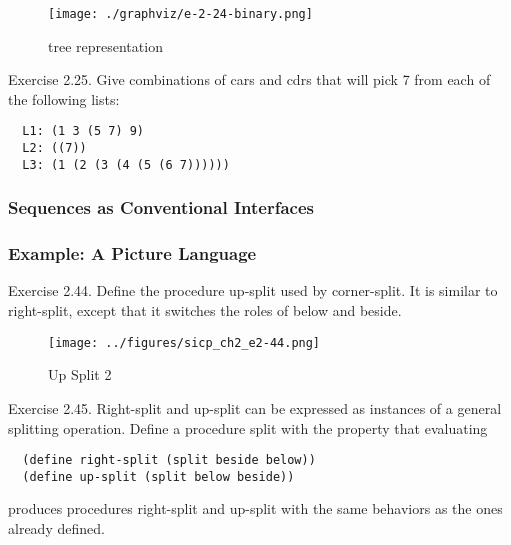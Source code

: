 \begin{figure}[H]
\begin{center}
\texttt{[image: ./graphviz/e-2-24-binary.png]}
\end{center}
\caption{tree representation}
\label{fig:binary}
\end{figure}


Exercise 2.25. Give combinations of cars and cdrs that will pick 7 from each of the following lists:

\begin{verbatim}
  L1: (1 3 (5 7) 9)
  L2: ((7))
  L3: (1 (2 (3 (4 (5 (6 7))))))
\end{verbatim}
\newline


            \subsubsection{Sequences as Conventional Interfaces}
            \subsubsection{Example: A Picture Language}
Exercise 2.44.  Define the procedure up-split used by corner-split.  It is similar to right-split, except that it switches the roles of below and beside.

\begin{figure}[H]
\begin{center}
\texttt{[image: ../figures/sicp\_ch2\_e2-44.png]}
\end{center}
\caption{Up Split 2}
\label{fig:up_split_2}
\end{figure}

Exercise 2.45.  Right-split and up-split can be expressed as instances of a general splitting operation. Define a procedure split with the property that evaluating
\begin{verbatim}
  (define right-split (split beside below))
  (define up-split (split below beside))
\end{verbatim}
produces procedures right-split and up-split with the same behaviors as the ones already defined.

